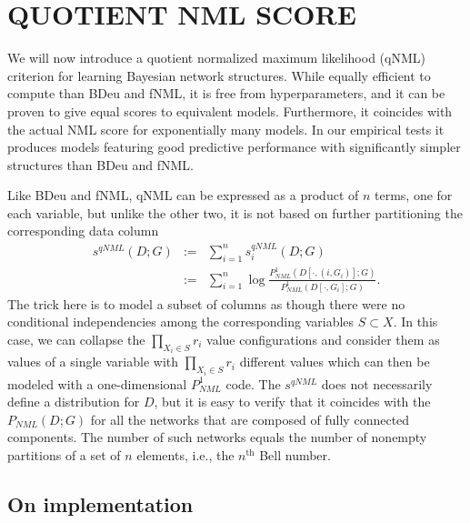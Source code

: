 \documentclass[letterpaper]{article}
\begin{document}
\section{QUOTIENT NML SCORE}

We will now introduce a quotient normalized maximum likelihood (qNML)
criterion for learning Bayesian network structures.  While equally
efficient to compute than BDeu and fNML, it is free from
hyperparameters, and it can be proven to give equal scores to
equivalent models. Furthermore, it coincides with the actual NML score
for exponentially many models. In our empirical tests it produces
models featuring good predictive performance with significantly
simpler structures than BDeu and fNML.

Like BDeu and fNML, qNML can be expressed as a product of $n$ terms,
one for each variable, but unlike the other two, it is not based on
further partitioning the corresponding data column
\begin{eqnarray}
s^{qNML}(D;G) & := & \sum_{i=1}^n s^{qNML}_i(D;G)\\
 & := & \sum_{i=1}^n \log \frac{P^1_{NML}(D[\cdot,(i,G_i)];G)}{P^1_{NML}(D[\cdot,G_i];G)}.\nonumber
\end{eqnarray}
The trick here is to model a subset of columns as though there were no
conditional independencies among the corresponding variables $S
\subset X$.  In this case, we can collapse the $\prod_{X_i\in S} r_i$
value configurations and consider them as values of a single variable
with $\prod_{X_i\in S} r_i$ different values which can then be modeled
with a one-dimensional $P^1_{NML}$ code.  The $s^{qNML}$ does not
necessarily define a distribution for $D$, but it is easy to verify
that it coincides with the $P_{NML}(D;G)$ for all the networks that
are composed of fully connected components.  The number of such
networks equals the number of nonempty partitions of a set of $n$
elements, i.e., the $n^\text{th}$ Bell number.

\subsection {On implementation}
\end{document}
